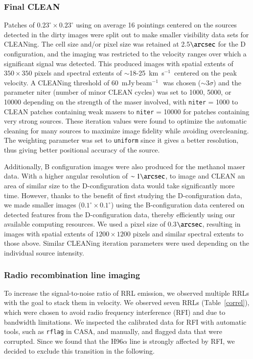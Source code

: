 \documentclass{aa}
\newcommand{\kms}{km~s$^{-1}$}
\DeclareRobustCommand{\kms}{km\,${\rm s}^{-1}$}
\DeclareRobustCommand{\jyb}{Jy\,beam${}^{-1}$\,}
\begin{document}
\subsubsection{Final CLEAN}
\label{sect:CLEAN}
Patches of $0.23^\circ \times 0.23^\circ$ using on average 16 pointings centered on the sources detected in the dirty images were split out to make smaller visibility data sets for CLEANing. The 
cell size and/or pixel size was retained at 2.5$\arcsec$ for the D configuration, and the imaging was restricted to the velocity ranges over which a significant signal was detected. This produced images with spatial extents of $350\times350$ pixels and spectral extents of $\sim$18-25~\kms\, centered on the peak velocity. A CLEANing threshold of 60~m\jyb\ was chosen ($\sim$3$\sigma$) and the parameter
niter (number of minor CLEAN cycles) was set to  1000, 5000, or 10000 depending on the strength of the maser involved, with \texttt{niter} = 1000 to CLEAN patches
containing weak masers to \texttt{niter} = 10000 for patches containing very strong sources. These iteration values were found to optimize the automatic cleaning for many sources to maximize image fidelity while avoiding overcleaning.
The weighting parameter was set to \texttt{uniform} since it gives a better resolution, thus giving better positional accuracy of the source.

Additionally,  B configuration images were also produced for the methanol maser data. With a higher angular resolution of $\sim1\arcsec$, to image and CLEAN an area of  similar size to the D-configuration data would take significantly more time. However, thanks to the benefit of first studying  the D-configuration data, we made smaller images ($0.1^\circ \times 0.1^\circ$) using the B-configuration data centered on detected features from the D-configuration data, thereby efficiently using our available computing resources. We used a pixel size of 0.3$\arcsec$, resulting in images with spatial extents of $1200\times1200$ pixels and similar spectral extents to those above. Similar CLEANing iteration parameters were used depending on the individual source intensity.


\subsubsection{Radio recombination line imaging}
To increase the signal-to-noise ratio of RRL emission, we observed multiple RRLs with the goal to stack them in velocity. We observed seven RRLs (Table~\ref{correl}), which were chosen to avoid radio frequency interference (RFI) and due to bandwidth limitations. We inspected the calibrated data for RFI with   automatic tools, such as {\tt rflag} in CASA, and manually, and flagged data that were corrupted. Since we found that the H96$\alpha$ line is strongly affected by RFI, we decided to exclude this transition in the following.
\end{document}
